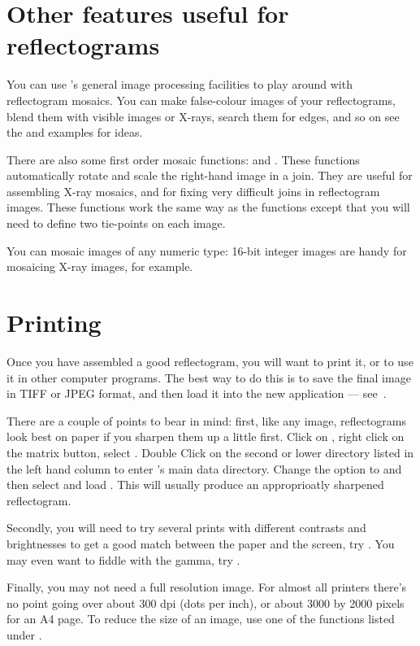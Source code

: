 \section{Other \nip{} features useful for reflectograms}

You can use \nip{}'s general image processing facilities to play around with
reflectogram mosaics. You can make false-colour images of your reflectograms,
blend them with visible images or X-rays, search them for edges, and so on
see the  and
examples for ideas.

There are also some first order mosaic functions:
 and
. These functions
automatically rotate and scale the right-hand image in a join. They are
useful for assembling X-ray mosaics, and for fixing very difficult joins in
reflectogram images. These functions work the same way as the 
functions except that you will need to define two tie-points on each image.

You can mosaic images of any numeric type: 16-bit integer images are handy for
mosaicing X-ray images, for example.

\section{Printing}

Once you have assembled a good reflectogram, you will want to print it,
or to use it in other computer programs. The best way to do this is to save
the final image in TIFF or JPEG format, and then load it into the new
application --- see~.

There are a couple of points to bear in mind: first, like any image,
reflectograms look best on paper if you sharpen them up a little first. Click
on , right click on
the matrix button, select . Double Click on the
second or lower  directory listed in the left hand column to
enter \nip{}'s main data directory. Change the 
option to  and then select and load .
This will usually produce an approprioatly sharpened reflectogram.

Secondly, you will need to try several prints with different contrasts
and brightnesses to get a good match between the paper and the screen,
try . You may even want to fiddle with
the gamma, try .

Finally, you may not need a full resolution image. For almost all printers
there's no point going over about 300 dpi (dots per inch), or about 3000 by
2000 pixels for an A4 page. To reduce the size of an image, use one of the 
functions listed under .


